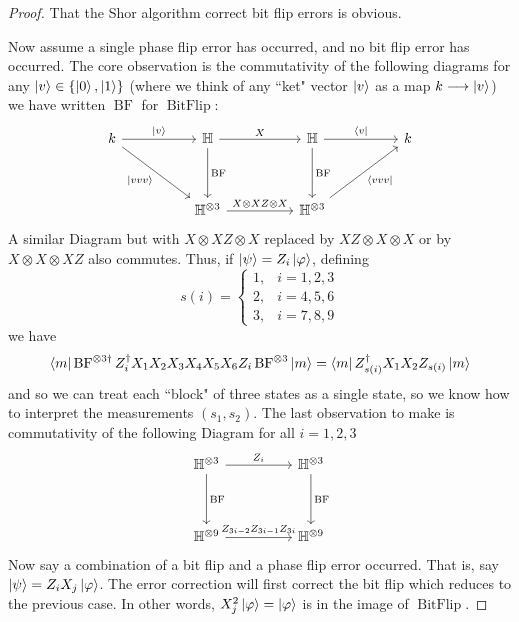 \documentclass[12pt]{article}
\theoremstyle{plain}
\theoremstyle{definition}
\newcommand{\bb}[1]{\mathbb{#1}}
\newcommand{\lto}{\longrightarrow}
\begin{document}
\begin{proof}
	That the Shor algorithm correct bit flip errors is obvious.
	
	Now assume a single phase flip error has occurred, and no bit flip error has occurred. The core observation is the commutativity of the following diagrams for any $\ket{v} \in \lbrace \ket{0},\ket{1}\rbrace$ (where we think of any ``ket" vector $\ket{v}$ as a map $k \lto \ket{v}$) we have written $\operatorname{BF}$ for $\operatorname{BitFlip}$:
	\begin{equation}
		\begin{tikzcd}[column sep = huge, row sep = huge]
			k\arrow[dr,swap,"{\ket{vvv}}"]\arrow[r,"{\ket{v}}"] & \bb{H}\arrow[r,"X"]\arrow[d,"{\operatorname{BF}}"] & \bb{H}\arrow[r,"{\bra{v}}"]\arrow[d,"{\operatorname{BF}}"] & k\\
			& \bb{H}^{\otimes 3}\arrow[r,"{X\otimes XZ \otimes X}"] & \bb{H}^{\otimes 3}\arrow[ur,swap,"{\bra{vvv}}"]
		\end{tikzcd}
	\end{equation}
	A similar Diagram but with $X\otimes XZ \otimes X$ replaced by $XZ\otimes X \otimes X$ or by $X\otimes X \otimes XZ$ also commutes. Thus, if $\ket{\psi} = Z_i\ket{\varphi}$, defining
	\begin{equation}
		s(i) =
		\begin{cases}
			1, & i = 1,2,3\\
			2, & i=4,5,6\\
			3, & i=7,8,9
		\end{cases}
	\end{equation}
	we have
	\begin{equation}
		\bra{m}\operatorname{BF}^{\otimes 3\dagger}Z_i^\dagger X_1X_2X_3X_4X_5X_6 Z_i \operatorname{BF}^{\otimes 3}\ket{m} = \bra{m}Z_{s(i)}^\dagger X_1X_2Z_{s(i)}\ket{m}
	\end{equation}
	and so we can treat each ``block" of three states as a single state, so we know how to interpret the measurements $(s_1,s_2)$. The last observation to make is commutativity of the following Diagram for all $i=1,2,3$
	\begin{equation}
		\begin{tikzcd}[column sep = huge, row sep = huge]
			\bb{H}^{\otimes 3}\arrow[r,"{Z_i}"]\arrow[d,"{\operatorname{BF}}"] & \bb{H}^{\otimes 3}\arrow[d,"{\operatorname{BF}}"]\\
			\bb{H}^{\otimes 9}\arrow[r,"{Z_{3i-2}Z_{3i-1}Z_{3i}}"] & \bb{H}^{\otimes 9}
		\end{tikzcd}
	\end{equation}
	Now say a combination of a bit flip and a phase flip error occurred. That is, say $\ket{\psi} = Z_iX_j\ket{\varphi}$. The error correction will first correct the bit flip which reduces to the previous case. In other words, $X_j^2 \ket{\varphi} = \ket{\varphi}$ is in the image of $\operatorname{BitFlip}$.
\end{proof}
\end{document}
